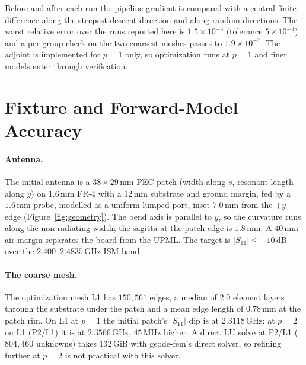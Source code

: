 \documentclass{anvil-paper}
\newcommand{\PL}{P2/L1}
\begin{document}
Before and after each run the pipeline gradient is compared with a central
finite difference along the steepest-descent direction and along random
directions. The worst relative error over the runs reported here is
$1.5\times10^{-5}$ (tolerance $5\times10^{-3}$), and a per-group check on the
two coarsest meshes passes to $1.9\times10^{-7}$. The adjoint is implemented
for $p = 1$ only, so optimization runs at $p = 1$ and finer models enter
through verification.

\section{Fixture and Forward-Model Accuracy}
\label{sec:accuracy}

\paragraph{Antenna.}
The initial antenna is a $38\times29$\,mm PEC patch (width along $s$,
resonant length along $y$) on $1.6$\,mm FR-4 with a $12$\,mm substrate and
ground margin, fed by a $1.6$\,mm probe, modelled as a uniform lumped port,
inset $7.0$\,mm from the $+y$ edge (Figure~\ref{fig:geometry}). The bend axis
is parallel to $y$, so the curvature runs along the non-radiating width; the
sagitta at the patch edge is $1.8$\,mm. A $40$\,mm air margin separates the
board from the UPML. The target is $|S_{11}| \le -10$\,dB over the
$2.400$--$2.4835$\,GHz ISM band.

\paragraph{The coarse mesh.}
The optimization mesh L1 has $150{,}561$ edges, a median of $2.0$ element
layers through the substrate under the patch and a mean edge length of
$0.78$\,mm at the patch rim. On L1 at $p = 1$ the initial patch's
$|S_{11}|$ dip is at $2.3118$\,GHz; at $p = 2$ on L1 (\PL) it is at
$2.3566$\,GHz, $45$\,MHz higher. A direct LU solve at \PL{} ($804{,}460$
unknowns) takes $132$\,GiB with geode-fem's direct solver, so refining
further at $p = 2$ is not practical with this solver.
\end{document}
